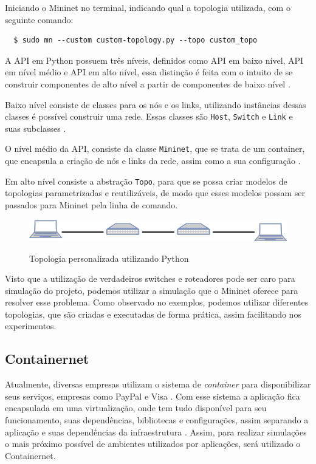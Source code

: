 \documentclass[12pt,
openright, 
oneside,
a4paper,
brazil]{facom-ufu-abntex2}
\theoremstyle{definition}
\begin{document}


Iniciando o Mininet no terminal, indicando qual a topologia utilizada, com o seguinte comando:

\begin{verbatim}
  $ sudo mn --custom custom-topology.py --topo custom_topo
\end{verbatim}

A API em Python possuem três níveis, definidos como API em baixo nível, API em nível médio e API
em alto nível, essa distinção é feita com o intuito de se construir componentes de alto nível
a partir de componentes de baixo nível \citep{mininetDocs}.

Baixo nível consiste de classes para os nós e os links, utilizando instâncias dessas 
classes é possível construir uma rede. Essas classes são \texttt{Host}, \texttt{Switch} e
\texttt{Link} e suas subclasses \citep{mininetDocs}.

O nível médio da API, consiste da classe \texttt{Mininet}, que se trata de um container,
que encapsula a criação de nós e links da rede, assim como a sua configuração \citep{mininetDocs}.

Em alto nível consiste a abstração \texttt{Topo}, para que se possa criar modelos de topologias 
parametrizadas e reutilizáveis, de modo que esses modelos possam ser passados para Mininet
pela linha de comando.

\begin{figure}[h]
    \caption{Topologia personalizada utilizando Python}
    \centering
    \includegraphics[width=\textwidth]{images/2sw-2host.png}
    \label{fig:custom-topology-example}
\end{figure}

Visto que a utilização de verdadeiros switches e roteadores pode ser caro para simulação do
projeto, podemos utilizar a simulação que o Mininet oferece para resolver esse problema.
Como observado no exemplos, podemos utilizar diferentes topologias, que são criadas e 
executadas de forma prática, assim facilitando nos experimentos.

\subsection{Containernet}
Atualmente, diversas empresas utilizam o sistema de \textit{container} para disponibilizar seus 
serviços, empresas como PayPal e Visa \citep{dockerSite}. Com esse sistema a aplicação 
fica encapsulada em uma virtualização, onde tem tudo disponível para seu funcionamento, suas 
dependências, bibliotecas e configurações, assim separando a aplicação e suas dependências 
da infraestrutura \citep{dockerSite}. Assim, para realizar simulações o mais próximo possível
de ambientes utilizados por aplicações, será utilizado o Containernet.
\end{document}
